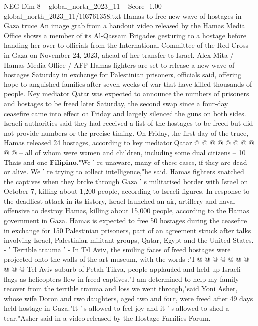 \begin{textsample}{NEG Dim 8 – global\_north\_2023\_11 – Score -1.00 – global\_north\_2023\_11/103761358.txt}  \label{ex:f8_neg_262}
Hamas to free new wave of hostages in Gaza truce An image grab from a handout video released by the Hamas Media Office shows a member of its Al-Qassam Brigades gesturing to a hostage before handing her over to officials from the International Committee of the Red Cross in Gaza on November 24, 2023, ahead of her transfer to Israel.
Alex Mita / Hamas Media Office / AFP Hamas fighters are set to release a new wave of hostages Saturday in exchange for Palestinian prisoners, officials said, offering hope to anguished families after seven weeks of war that have killed thousands of people.
Key mediator Qatar was expected to announce the numbers of prisoners and hostages to be freed later Saturday, the second swap since a four-day ceasefire came into effect on Friday and largely silenced the guns on both sides.
Israeli authorities said they had received a list of the hostages to be freed but did not provide numbers or the precise timing.
On Friday, the first day of the truce, Hamas released 24 hostages, according to key mediator Qatar @ @ @ @ @ @ @ @ @ @ -- all of whom were women and children, including some dual citizens -- 10 Thais and one \textbf{Filipino}."We ' re unaware, many of these cases, if they are dead or alive.
We ' re trying to collect intelligence,"he said.
Hamas fighters snatched the captives when they broke through Gaza ' s militarised border with Israel on October 7, killing about 1,200 people, according to Israeli figures.
In response to the deadliest attack in its history, Israel launched an air, artillery and naval offensive to destroy Hamas, killing about 15,000 people, according to the Hamas government in Gaza.
Hamas is expected to free 50 hostages during the ceasefire in exchange for 150 Palestinian prisoners, part of an agreement struck after talks involving Israel, Palestinian militant groups, Qatar, Egypt and the United States. - ' Terrible trauma ' - In Tel Aviv, the smiling faces of freed hostages were projected onto the walls of the art museum, with the words :"I @ @ @ @ @ @ @ @ @ @ Tel Aviv suburb of Petah Tikva, people applauded and held up Israeli flags as helicopters flew in freed captives."I am determined to help my family recover from the terrible trauma and loss we went through,"said Yoni Asher, whose wife Doron and two daughters, aged two and four, were freed after 49 days held hostage in Gaza."It ' s allowed to feel joy and it ' s allowed to shed a tear,"Asher said in a video released by the Hostage Families Forum.

\end{textsample}
